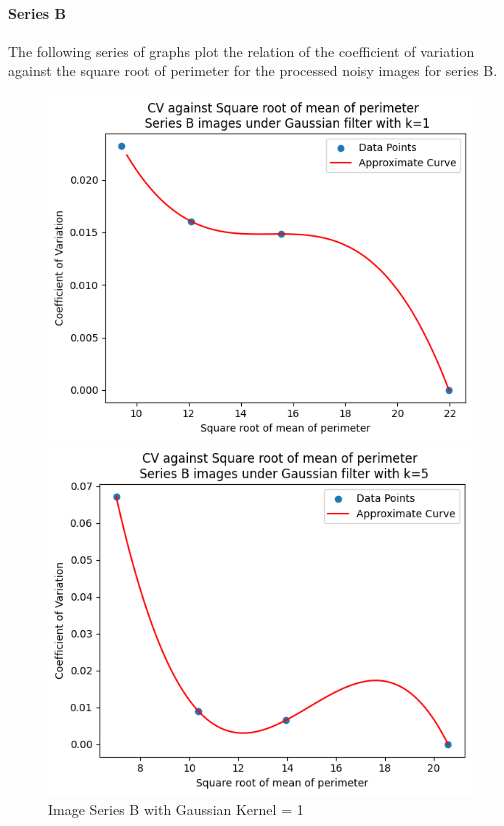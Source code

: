 \documentclass[runningheads]{llncs}
\begin{document}
\paragraph*{\textbf{Series B}}
The following series of graphs plot the relation of the coefficient of variation against the square root of perimeter for the processed noisy images for series B. 
\begin{figure}[h!]
\begin{minipage}[h]{0.47\linewidth}
\begin{center}
\includegraphics[width=1\linewidth]{Report/Result_Images/series_B_Gaussian_kernel_1_perimeter.png} 
\caption{Image Series B with Gaussian Kernel = 1}
\label{SeriesB-Gaussian-Kernel1-PerimeterGraph}
\end{center} 
\end{minipage}
\hfill
\vspace{0.2 cm}
\begin{minipage}[h]{0.47\linewidth}
\begin{center}
\includegraphics[width=1\linewidth]{Report/Result_Images/series_B_Gaussian_kernel_5_perimeter.png} 

\end{center}
\end{minipage}
\end{figure}
\end{document}
